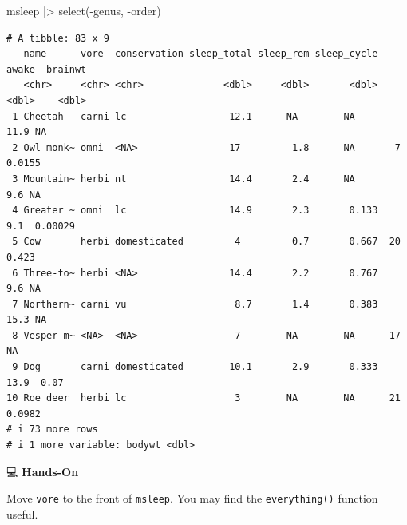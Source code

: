 \documentclass[
  letterpaper,
  DIV=11,
  numbers=noendperiod]{scrreprt}
\newenvironment{Shaded}{\begin{snugshade}}{\end{snugshade}}
\newcommand{\FunctionTok}[1]{\textcolor[rgb]{0.28,0.35,0.67}{#1}}
\newcommand{\NormalTok}[1]{\textcolor[rgb]{0.00,0.23,0.31}{#1}}
\newcommand{\SpecialCharTok}[1]{\textcolor[rgb]{0.37,0.37,0.37}{#1}}
\begin{document}
\begin{tcolorbox}[enhanced jigsaw, colbacktitle=quarto-callout-tip-color!10!white, opacitybacktitle=0.6, breakable, left=2mm, leftrule=.75mm, toprule=.15mm, toptitle=1mm, bottomtitle=1mm, colframe=quarto-callout-tip-color-frame, opacityback=0, coltitle=black, arc=.35mm, titlerule=0mm, colback=white, bottomrule=.15mm, title=\textcolor{quarto-callout-tip-color}{\faLightbulb}\hspace{0.5em}{Answer}, rightrule=.15mm]

\begin{Shaded}
\begin{Highlighting}[]
\NormalTok{msleep }\SpecialCharTok{|\textgreater{}}
  \FunctionTok{select}\NormalTok{(}\SpecialCharTok{{-}}\NormalTok{genus, }\SpecialCharTok{{-}}\NormalTok{order)}
\end{Highlighting}
\end{Shaded}

\begin{verbatim}
# A tibble: 83 x 9
   name      vore  conservation sleep_total sleep_rem sleep_cycle awake  brainwt
   <chr>     <chr> <chr>              <dbl>     <dbl>       <dbl> <dbl>    <dbl>
 1 Cheetah   carni lc                  12.1      NA        NA      11.9 NA      
 2 Owl monk~ omni  <NA>                17         1.8      NA       7    0.0155 
 3 Mountain~ herbi nt                  14.4       2.4      NA       9.6 NA      
 4 Greater ~ omni  lc                  14.9       2.3       0.133   9.1  0.00029
 5 Cow       herbi domesticated         4         0.7       0.667  20    0.423  
 6 Three-to~ herbi <NA>                14.4       2.2       0.767   9.6 NA      
 7 Northern~ carni vu                   8.7       1.4       0.383  15.3 NA      
 8 Vesper m~ <NA>  <NA>                 7        NA        NA      17   NA      
 9 Dog       carni domesticated        10.1       2.9       0.333  13.9  0.07   
10 Roe deer  herbi lc                   3        NA        NA      21    0.0982 
# i 73 more rows
# i 1 more variable: bodywt <dbl>
\end{verbatim}

\end{tcolorbox}

💻 \textbf{Hands-On}

Move \texttt{vore} to the front of \texttt{msleep}. You may find the
\texttt{everything()} function useful.
\end{document}

